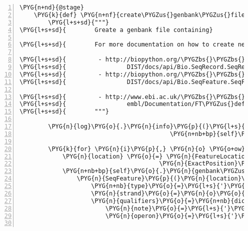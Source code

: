 \begin{Verbatim}[commandchars=\\\{\},numbers=left,firstnumber=1,stepnumber=5]
    \PYG{n+nd}{@stage}
    \PYG{k}{def} \PYG{n+nf}{create\PYGZus{}genbank\PYGZus{}file}\PYG{p}{(}\PYG{n+nb+bp}{self}\PYG{p}{)}\PYG{p}{:}
        \PYG{l+s+sd}{"""}
\PYG{l+s+sd}{        Greate a genbank file containing}

\PYG{l+s+sd}{        For more documentation on how to create new features, visit}

\PYG{l+s+sd}{         - http://biopython.org/\PYGZbs{}\PYGZbs{}}
\PYG{l+s+sd}{                 DIST/docs/api/Bio.SeqRecord.SeqRecord-class.html\PYGZsh{}\PYGZus{}\PYGZus{}getitem\PYGZus{}\PYGZus{}}
\PYG{l+s+sd}{         - http://biopython.org/\PYGZbs{}\PYGZbs{}}
\PYG{l+s+sd}{                 DIST/docs/api/Bio.SeqFeature.SeqFeature-class.html}

\PYG{l+s+sd}{         - http://www.ebi.ac.uk/\PYGZbs{}\PYGZbs{}}
\PYG{l+s+sd}{                 embl/Documentation/FT\PYGZus{}definitions/feature\PYGZus{}table.html}
\PYG{l+s+sd}{        """}

        \PYG{n}{log}\PYG{o}{.}\PYG{n}{info}\PYG{p}{(}\PYG{l+s}{"}\PYG{l+s}{augmenting genbank file }\PYG{l+s+si}{\PYGZpc{}s}\PYG{l+s}{ with putative operons}\PYG{l+s}{"} \PYG{o}{\PYGZpc{}}
                                          \PYG{n+nb+bp}{self}\PYG{o}{.}\PYG{n}{analysis}\PYG{o}{.}\PYG{n}{genbankfile\PYGZus{}name}\PYG{p}{)}

        \PYG{k}{for} \PYG{n}{i}\PYG{p}{,} \PYG{n}{o} \PYG{o+ow}{in} \PYG{n+nb}{enumerate}\PYG{p}{(}\PYG{n+nb+bp}{self}\PYG{o}{.}\PYG{n}{operons}\PYG{p}{)}\PYG{p}{:}
            \PYG{n}{location} \PYG{o}{=} \PYG{n}{FeatureLocation}\PYG{p}{(}\PYG{n}{ExactPosition}\PYG{p}{(}\PYG{n}{o}\PYG{o}{.}\PYG{n}{begin}\PYG{p}{)}\PYG{p}{,}
                                       \PYG{n}{ExactPosition}\PYG{p}{(}\PYG{n}{o}\PYG{o}{.}\PYG{n}{end}\PYG{p}{)}\PYG{p}{)}
            \PYG{n+nb+bp}{self}\PYG{o}{.}\PYG{n}{genbank\PYGZus{}record}\PYG{o}{.}\PYG{n}{features}\PYG{o}{.}\PYG{n}{append}\PYG{p}{(}
                \PYG{n}{SeqFeature}\PYG{p}{(}\PYG{n}{location}\PYG{p}{,}
                    \PYG{n+nb}{type}\PYG{o}{=}\PYG{l+s}{'}\PYG{l+s}{mRNA}\PYG{l+s}{'}\PYG{p}{,}
                    \PYG{n}{strand}\PYG{o}{=}\PYG{n}{o}\PYG{o}{.}\PYG{n}{strand}\PYG{p}{,}
                    \PYG{n}{qualifiers}\PYG{o}{=}\PYG{n+nb}{dict}\PYG{p}{(}
                        \PYG{n}{note}\PYG{o}{=}\PYG{l+s}{'}\PYG{l+s}{putative, confidence }\PYG{l+s+si}{\PYGZpc{}d}\PYG{l+s+si}{\PYGZpc{}\PYGZpc{}}\PYG{l+s}{'} \PYG{o}{\PYGZpc{}} \PYG{n}{o}\PYG{o}{.}\PYG{n}{confidence}\PYG{p}{,}
                        \PYG{n}{operon}\PYG{o}{=}\PYG{l+s}{'}\PYG{l+s}{rnas-}\PYG{l+s+si}{\PYGZpc{}d}\PYG{l+s}{'} \PYG{o}{\PYGZpc{}} \PYG{n}{i}\PYG{p}{)}\PYG{p}{)}\PYG{p}{)}


\end{Verbatim}
